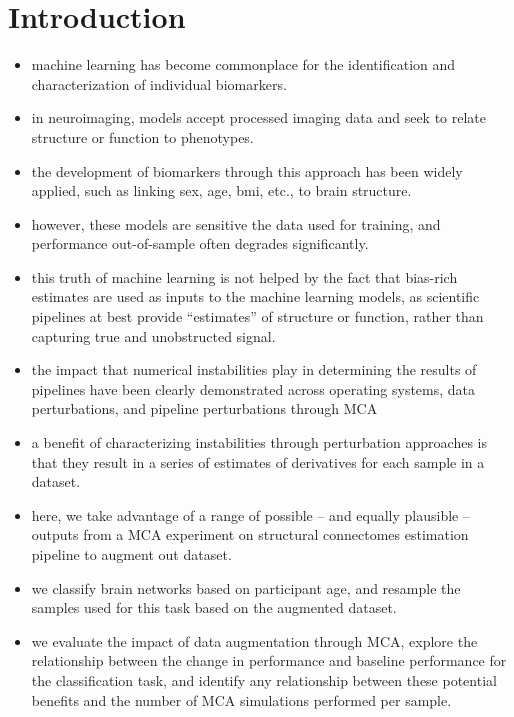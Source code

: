 \documentclass[10pt]{SelfArx} %
\affiliation{\textsuperscript{1}\textit{Montréal Neurological Institute, McGill University, Montréal, QC, Canada}}
\affiliation{\textsuperscript{2}\textit{Department of Computer Science and Software Engineering, Concordia University, Montréal, QC, Canada}}
\begin{document}
\flushbottom %
\maketitle %
\thispagestyle{empty} %

\pagestyle{fancy}
\section*{Introduction}
\begin{itemize}
\item machine learning has become commonplace for the identification and characterization of individual biomarkers.
\item in neuroimaging, models accept processed imaging data and seek to relate structure or function to phenotypes.
\item the development of biomarkers through this approach has been widely applied, such as linking sex, age, bmi, etc.,
to brain structure.
\item however, these models are sensitive the data used for training, and performance out-of-sample often degrades
significantly.
\item this truth of machine learning is not helped by the fact that bias-rich estimates are used as inputs to the
machine learning models, as scientific pipelines at best provide ``estimates'' of structure or function, rather than
capturing true and unobstructed signal.
\item the impact that numerical instabilities play in determining the results of pipelines have been clearly
demonstrated across operating systems, data perturbations, and pipeline perturbations through MCA
\item a benefit of characterizing instabilities through perturbation approaches is that they result in a series of
estimates of derivatives for each sample in a dataset.
\item here, we take advantage of a range of possible – and equally plausible – outputs from a MCA experiment on
structural connectomes estimation pipeline to augment out dataset.
\item we classify brain networks based on participant age, and resample the samples used for this task based on the
augmented dataset.
\item we evaluate the impact of data augmentation through MCA, explore the relationship between the change in
performance and baseline performance for the classification task, and identify any relationship between these potential
benefits and the number of MCA simulations performed per sample.
\end{itemize}
\end{document}
